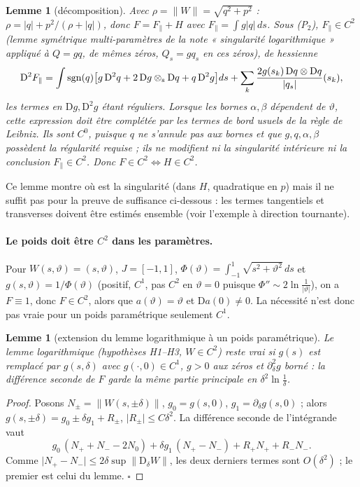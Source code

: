\documentclass[11pt,a4paper]{article}
\newtheorem{lemme}[theoreme]{Lemme}
\theoremstyle{remark}
\newcommand{\vth}{\vartheta}
\newcommand{\D}{\mathrm D}
\begin{document}
\begin{lemme}[décomposition]\label{lem:dec}
Avec $\rho=\lVert W\rVert=\sqrt{q^2+p^2}$ : $\rho=\lvert q\rvert+p^2/(\rho+\lvert q\rvert)$, donc $F=F_\parallel+H$ avec $F_\parallel=\int g\lvert q\rvert\,ds$. Sous (P$_2$), $F_\parallel\in C^2$ (lemme symétrique multi-paramètres de la note « singularité logarithmique » appliqué à $Q=gq$, de mêmes zéros, $Q_s=gq_s$ en ces zéros), de hessienne
\[
\D^2F_\parallel=\int\mathrm{sgn}(q)\bigl[g\,\D^2q+2\,\D g\otimes_{\rm s}\D q+q\,\D^2g\bigr]ds+\sum_k\frac{2g(s_k)\,\D q\otimes\D q}{\lvert q_s\rvert}(s_k),
\]
les termes en $\D g,\D^2g$ étant réguliers. Lorsque les bornes $\alpha,\beta$ dépendent de $\vth$, cette expression doit être complétée par les termes de bord usuels de la règle de Leibniz. Ils sont $C^0$, puisque $q$ ne s'annule pas aux bornes et que $g,q,\alpha,\beta$ possèdent la régularité requise ; ils ne modifient ni la singularité intérieure ni la conclusion $F_\parallel\in C^2$. Donc $F\in C^2\iff H\in C^2$.
\end{lemme}
Ce lemme montre où est la singularité (dans $H$, quadratique en $p$) mais il ne suffit pas pour la preuve de suffisance ci-dessous : les termes tangentiels et transverses doivent être estimés ensemble (voir l'exemple à direction tournante).

\paragraph{Le poids doit être $C^2$ dans les paramètres.} Pour $W(s,\vth)=(s,\vth)$, $J=[-1,1]$, $\Phi(\vth)=\int_{-1}^1\sqrt{s^2+\vth^2}\,ds$ et $g(s,\vth)=1/\Phi(\vth)$ (positif, $C^1$, pas $C^2$ en $\vth=0$ puisque $\Phi''\sim2\ln\frac1{\lvert\vth\rvert}$), on a $F\equiv1$, donc $F\in C^2$, alors que $a(\vth)=\vth$ et $\D a(0)\ne0$. La nécessité n'est donc pas vraie pour un poids paramétrique seulement $C^1$.

\begin{lemme}[extension du lemme logarithmique à un poids paramétrique]\label{lem:logparam}
Le lemme logarithmique (hypothèses H1--H3, $W\in C^2$) reste vrai si $g(s)$ est remplacé par $g(s,\delta)$ avec $g(\cdot,0)\in C^1$, $g>0$ aux zéros et $\partial_\delta^2g$ borné : la différence seconde de $F$ garde la même partie principale en $\delta^2\ln\frac1\delta$.
\end{lemme}
\begin{proof}
Posons $N_\pm=\lVert W(s,\pm\delta)\rVert$, $g_0=g(s,0)$, $g_1=\partial_\delta g(s,0)$ ; alors $g(s,\pm\delta)=g_0\pm\delta g_1+R_\pm$, $\lvert R_\pm\rvert\le C\delta^2$. La différence seconde de l'intégrande vaut
\[
g_0\,(N_++N_--2N_0)+\delta g_1\,(N_+-N_-)+R_+N_++R_-N_- .
\]
Comme $\lvert N_+-N_-\rvert\le2\delta\sup\lVert\D_\delta W\rVert$, les deux derniers termes sont $O(\delta^2)$ ; le premier est celui du lemme. $\square$
\end{proof}
\end{document}
